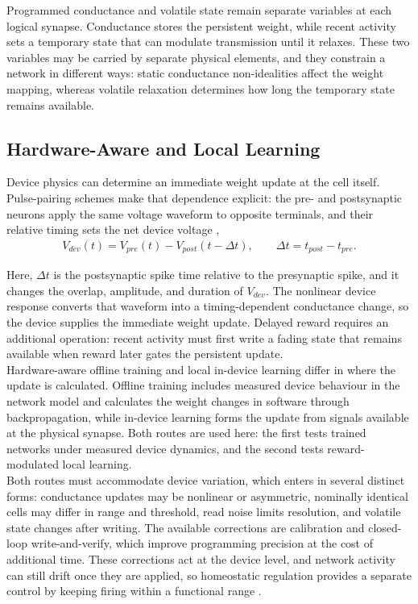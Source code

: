 \noindent Programmed conductance and volatile state remain separate variables at each logical synapse. Conductance
stores the persistent weight, while recent activity sets a temporary state that can modulate transmission until it
relaxes. These two variables may be carried by separate physical elements, and they constrain a network in different
ways: static conductance non-idealities affect the weight mapping, whereas volatile relaxation determines how long the
temporary state remains available.

\subsection[Hardware-Aware and Local Learning]{Hardware-Aware and Local Learning}\label{subsec:hardware-aware}

\noindent Device physics can determine an immediate weight update at the cell itself. Pulse-pairing schemes make that
dependence explicit: the pre- and postsynaptic neurons apply the same voltage waveform to opposite terminals, and
their relative timing sets the net device voltage \cite{campbell2016pulse},
\begin{align}
    V_{dev}(t) = V_{pre}(t) - V_{post}(t - \Delta t), \qquad \Delta t = t_{post} - t_{pre}. \label{eq:2.8}
\end{align}

\noindent Here, $\Delta t$ is the postsynaptic spike time relative to the presynaptic spike, and it changes the
overlap, amplitude, and duration of $V_{dev}$. The nonlinear device response converts that waveform into a
timing-dependent conductance change, so the device supplies the immediate weight update. Delayed reward
requires an additional operation: recent activity must first write a fading state that remains available when reward
later gates the persistent update.\\

\noindent Hardware-aware offline training and local in-device learning differ in where the update is calculated.
Offline training includes measured device behaviour in the network model and calculates the weight changes in
software through backpropagation, while in-device learning forms the update from signals available at the physical
synapse. Both routes are used here: the first tests trained networks under measured device dynamics, and the second
tests reward-modulated local learning.\\

\noindent Both routes must accommodate device variation, which enters in several distinct forms: conductance updates
may be nonlinear or asymmetric, nominally identical cells may differ in range and threshold, read noise limits
resolution, and volatile state changes after writing. The available corrections are calibration and closed-loop
write-and-verify, which improve programming precision at the cost of additional time. These corrections act at the
device level, and network activity can still drift once they are applied, so homeostatic regulation provides a separate
control by keeping firing within a functional range \cite{turrigiano1999homeostatic}.\\

